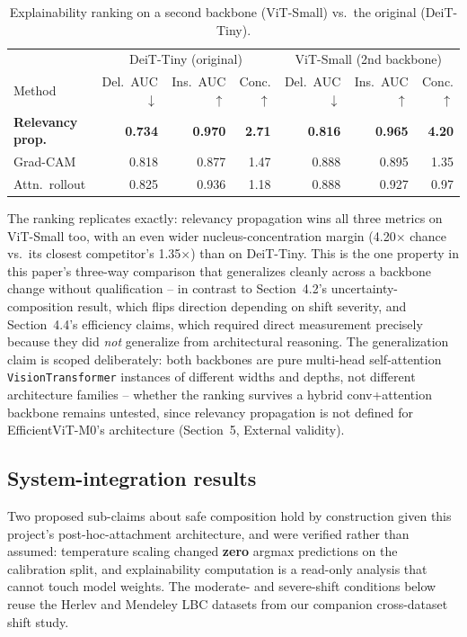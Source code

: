 \documentclass[runningheads]{llncs}
\begin{document}
\begin{table}[htbp]
\centering
\caption{Explainability ranking on a second backbone (ViT-Small) vs.\ the original (DeiT-Tiny).}
\label{tab:rq3-vit-small}
\begin{tabular}{lrrrrrr}
\toprule
 & \multicolumn{3}{c}{DeiT-Tiny (original)} & \multicolumn{3}{c}{ViT-Small (2nd backbone)} \\
Method & Del.\ AUC$\downarrow$ & Ins.\ AUC$\uparrow$ & Conc.$\uparrow$ & Del.\ AUC$\downarrow$ & Ins.\ AUC$\uparrow$ & Conc.$\uparrow$ \\
\midrule
\textbf{Relevancy prop.} & \textbf{0.734} & \textbf{0.970} & \textbf{2.71} & \textbf{0.816} & \textbf{0.965} & \textbf{4.20} \\
Grad-CAM & 0.818 & 0.877 & 1.47 & 0.888 & 0.895 & 1.35 \\
Attn.\ rollout & 0.825 & 0.936 & 1.18 & 0.888 & 0.927 & 0.97 \\
\bottomrule
\end{tabular}
\end{table}

The ranking replicates exactly: relevancy propagation wins all three
metrics on ViT-Small too, with an even wider nucleus-concentration margin
(4.20$\times$ chance vs.\ its closest competitor's 1.35$\times$) than on
DeiT-Tiny. This is the one property in this paper's three-way comparison
that generalizes cleanly across a backbone change without qualification --
in contrast to Section~4.2's uncertainty-composition result, which flips
direction depending on shift severity, and Section~4.4's efficiency
claims, which required direct measurement precisely because they did
\emph{not} generalize from architectural reasoning. The generalization
claim is scoped deliberately: both backbones are pure multi-head
self-attention \texttt{VisionTransformer} instances of different widths
and depths, not different architecture families -- whether the ranking
survives a hybrid conv+attention backbone remains untested, since
relevancy propagation is not defined for EfficientViT-M0's architecture
(Section~5, External validity).

\subsection{System-integration results}

Two proposed sub-claims about safe composition hold by construction given
this project's post-hoc-attachment architecture, and were verified rather
than assumed: temperature scaling changed \textbf{zero} argmax predictions
on the calibration split, and explainability computation is a read-only
analysis that cannot touch model weights. The moderate- and severe-shift
conditions below reuse the Herlev \cite{jantzen2005herlev} and Mendeley
LBC \cite{hussain2020mendeley} datasets from our companion cross-dataset
shift study.
\end{document}
